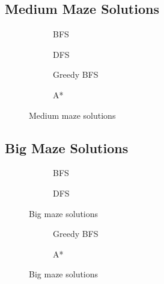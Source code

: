 \documentclass{article}
\begin{document}
\subsection{Medium Maze Solutions}
\begin{figure}[H]
\centering
\begin{subfigure}{.5\textwidth}
\caption{BFS}
\label{fig:mediumMaze:bfs}
\end{subfigure}%
\begin{subfigure}{.5\textwidth}
\label{fig:mediumMaze:dfs}
\caption{DFS}
\end{subfigure}
\begin{subfigure}{.5\textwidth}
\label{fig:mediumMaze:gbfs}
\caption{Greedy BFS}
\end{subfigure}%
\begin{subfigure}{.5\textwidth}
\label{fig:mediumMaze:astar}
\caption{A*}
\end{subfigure}%

\caption{Medium maze solutions}
\end{figure}

\newpage
\subsection{Big Maze Solutions}
\begin{figure}[H]
\centering
\begin{subfigure}{.5\textwidth}
\caption{BFS}
\label{fig:bigMaze:bfs}
\end{subfigure}%
\begin{subfigure}{.5\textwidth}
\label{fig:bigMaze:dfs}
\caption{DFS}
\end{subfigure}

\caption{Big maze solutions}
\end{figure}
\begin{figure}
\begin{subfigure}{.5\textwidth}
\label{fig:bigMaze:gbfs}
\caption{Greedy BFS}
\end{subfigure}%
\begin{subfigure}{.5\textwidth}
\label{fig:bigMaze:astar}
\caption{A*}
\end{subfigure}%

\caption{Big maze solutions}
\end{figure}
\end{document}
